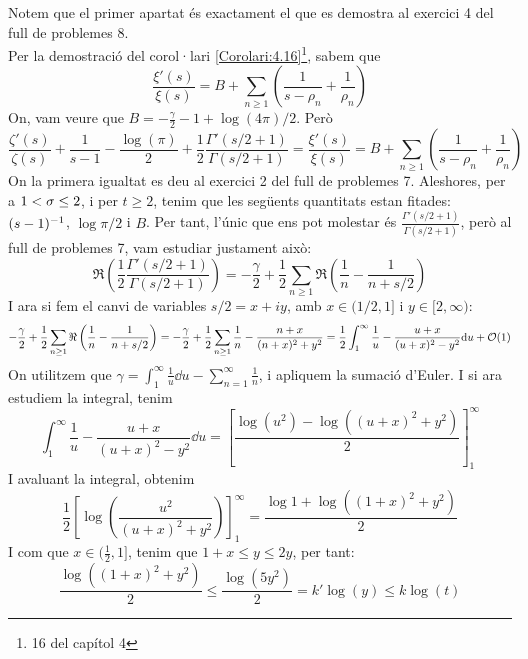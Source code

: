 \begin{pf}
    Notem que el primer apartat és exactament el que es demostra al exercici 4 del full de problemes 8.\\[5mm]
    Per la demostració del corol·lari \ref{Corolari:4.16}\footnote{16 del capítol 4}, sabem que
    \[
        \frac{\xi'(s)}{\xi(s)}=B+\sum_{n\geq1}\left(\frac{1}{s-\rho_n}+\frac{1}{\rho_n}\right)
    \]
    On, vam veure que $B=-\frac{\gamma}{2}-1+\log(4\pi)/2$. Però
    \[
        \frac{\zeta'(s)}{\zeta(s)}+\frac{1}{s-1}-\frac{\log(\pi)}{2}+\frac{1}{2}\frac{\Gamma'(s/2+1)}{\Gamma(s/2+1)}=\frac{\xi'(s)}{\xi(s)}=B+\sum_{n\geq1}\left(\frac{1}{s-\rho_n}+\frac{1}{\rho_n}\right)
    \]
    On la primera igualtat es deu al exercici 2 del full de problemes 7. Aleshores, per a $1<\sigma\leq 2$, i per $t\geq2$, tenim que les següents quantitats estan fitades: $(s-1)^{-1}$, $\log \pi/2$ i $B$. Per tant, l'únic que ens pot molestar és $\frac{\Gamma'(s/2+1)}{\Gamma(s/2+1)}$, però al full de problemes 7, vam estudiar justament això:
    \[
        \Re\left(\frac{1}{2}\frac{\Gamma'(s/2+1)}{\Gamma(s/2+1)}\right)=-\frac{\gamma}{2}+\frac{1}{2}\sum_{n\geq1}\Re\left(\frac{1}{n}-\frac1{n+s/2}\right)
    \]
    I ara si fem el canvi de variables $s/2=x+iy$, amb $x\in(1/2,1]$ i $y\in[2,\infty)$:
    \[
        -\frac{\gamma}{2}+\frac{1}{2}\sum_{n\geq1}\Re\left(\frac{1}{n}-\frac1{n+s/2}\right)=
        -\frac{\gamma}{2}+\frac{1}{2}\sum_{n\geq1}\frac{1}{n}-
            \frac{n+x}{(n+x)^2+y^2}=\frac{1}{2}\int_{1}^{\infty}\frac{1}{u}-\frac{u+x}{(u+x)^2-y^2}\mathrm{d} u+\mathcal O(1)
    \]
    On utilitzem que $\gamma=\int_{1}^{\infty}\frac{1}{u}\dd u-\sum_{n=1}^\infty\frac{1}{n}$, i apliquem la sumació d'Euler. I si ara estudiem la integral, tenim
    \[
        \int_{1}^{\infty}\frac{1}{u}-\frac{u+x}{(u+x)^2-y^2}\dd u=\left[\frac{\log(u^2)-\log((u+x)^2+y^2)}{2}
        \right]_1^\infty
    \]
    I avaluant la integral, obtenim
    \[
        \frac{1}{2}\left[\log\left(\frac{u^2}{(u+x)^2+y^2}\right)\right]_1^\infty=
        \frac{\log1+\log((1+x)^2+y^2)}{2}
    \]
    I com que $x\in (\frac{1}{2},1]$, tenim que $1+x\leq y\leq 2y$, per tant:
    \[
    \frac{\log((1+x)^2+y^2)}{2}\leq \frac{\log(5y^2)}{2}=k'\log(y)\leq k\log(t)
    \]
\end{pf}
